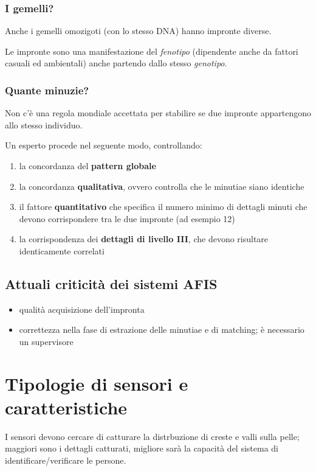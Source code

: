 \subsubsection{I gemelli?}

Anche i gemelli omozigoti (con lo stesso DNA) hanno impronte diverse.

Le impronte sono una manifestazione del \textit{fenotipo} (dipendente anche da fattori casuali ed 
ambientali) anche partendo dallo stesso \textit{genotipo}.

\subsubsection{Quante minuzie?}
Non c'è una regola mondiale accettata per stabilire se due impronte appartengono allo stesso
individuo.

Un esperto procede nel seguente modo, controllando:
\begin{enumerate}
    \item la concordanza del \textbf{pattern globale}
    \item la concordanza \textbf{qualitativa}, ovvero controlla che le minutiae siano identiche
    \item il fattore \textbf{quantitativo} che specifica il numero minimo di dettagli minuti che
    devono corrispondere tra le due impronte (ad esempio 12)
    \item la corrispondenza dei \textbf{dettagli di livello III}, che devono risultare identicamente correlati
\end{enumerate}

\subsection{Attuali criticità dei sistemi AFIS}

\begin{itemize}
    \item qualità acquisizione dell'impronta
    \item correttezza nella fase di estrazione delle minutiae e di matching; è necessario un supervisore
\end{itemize}

\section{Tipologie di sensori e caratteristiche}

I sensori devono cercare di catturare la distrbuzione di creste e valli sulla pelle;
maggiori sono i dettagli catturati, migliore sarà la capacità del sistema di 
identificare/verificare le persone.

